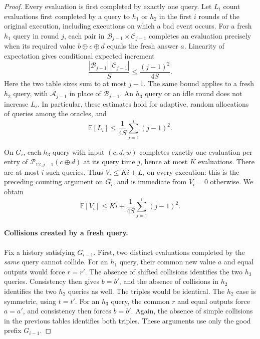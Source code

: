 \documentclass[11pt,letterpaper]{article}
\theoremstyle{definition} %
\begin{document}
\begin{proof}
Every evaluation is first completed by exactly one query. Let $L_i$
count evaluations first completed by a query to $h_1$ or $h_2$ in the
first $i$ rounds of the original execution, including executions on
which a bad event occurs. For a fresh $h_1$ query in round $j$, each
pair in $\mathcal{B}_{j-1}\times\mathcal{C}_{j-1}$ completes an
evaluation precisely when its required value $b\oplus c\oplus d$
equals the fresh answer $a$. Linearity of expectation gives conditional
expected increment
\[
 \frac{|\mathcal{B}_{j-1}|\,|\mathcal{C}_{j-1}|}{S}
 \leq\frac{(j-1)^2}{4S}.
\]
Here the two table sizes sum to at most $j-1$. The same bound applies
to a fresh $h_2$ query, with $\mathcal{A}_{j-1}$ in place of
$\mathcal{B}_{j-1}$. An $h_3$ query or an idle round does not increase
$L_i$. In particular, these estimates hold for adaptive, random
allocations of queries among the oracles, and
\begin{equation}
 \mathbb{E}[L_i]\leq\frac{1}{4S}\sum_{j=1}^{i}(j-1)^2.
 \label{eq:t5-late-inner-evaluations}
\end{equation}

On $G_i$, each $h_3$ query with input $(c,d,w)$ completes exactly one
evaluation per entry of $\mathcal{P}_{12,j-1}(c\oplus d)$ at its
query time $j$, hence at most $K$ evaluations. There are at most $i$
such queries. Thus $V_i\leq Ki+L_i$ on every execution: this is the
preceding counting argument on $G_i$, and is immediate from $V_i=0$
otherwise. We obtain
\begin{equation}
 \mathbb{E}[V_i]
 \leq Ki+\frac{1}{4S}\sum_{j=1}^{i}(j-1)^2.
 \label{eq:t5-expected-evaluations}
\end{equation}

\paragraph{Collisions created by a fresh query.}
Fix a history satisfying $G_{i-1}$. First, two distinct evaluations
completed by the \emph{same} query cannot collide. For an $h_1$ query,
their common new value $a$ and equal outputs would force $r=r'$.
The absence of shifted collisions identifies the two $h_3$ queries.
Consistency then gives $b=b'$, and the absence of collisions in $h_2$
identifies the two $h_2$ queries as well. The triples would be identical.
The $h_2$ case is symmetric, using $t=t'$. For an $h_3$ query, the
common $r$ and equal outputs force $a=a'$, and consistency then forces
$b=b'$. Again, the absence of simple collisions in the previous tables
identifies both triples. These arguments use only the good prefix
$G_{i-1}$.


\end{proof}
\end{document}
